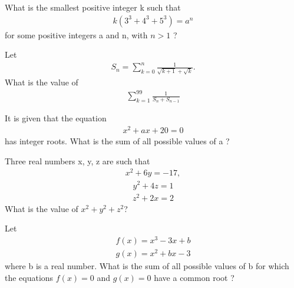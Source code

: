 \item What is the smallest positive integer k such that
\begin{align} 
k(3^{3} + 4^{3} + 5^{3}) = a^{n} 
\end{align}
for some positive integers a and n, with $n > 1$ ?

\item Let 
\begin{align*}
S_{n} = \sum_{k=0}^{n} \frac{1}{\sqrt{k+1} + \sqrt{k}}.
\end{align*}
What is the value of
\begin{align*} 
\sum_{k = 1}^{99} \frac{1}{S_{n} + S_{n - 1}}
\end{align*} 

\item It is given that the equation 
\begin{align}
x^{2} + ax + 20 = 0
\end{align}
has integer roots. What is the sum of all possible values of a ?

\item Three real numbers x, y, z are such that
\begin{align} 
x^{2} + 6y = -17,
\end{align}
\begin{align}
y^{2} + 4z = 1 
\end{align}
\begin{align}
z^{2} + 2x = 2 
\end{align}
What is the value of $x^{2} + y^{2} + z^{2}$?

\item Let 
\begin{align*}
f(x) = x^{3} - 3x + b
\end{align*}
\begin{align*} 
g(x) = x^{2} + bx - 3
\end{align*} 
where b is a real number. What is the sum of all possible values of b for which the equations $f(x) = 0$ and $g(x) = 0$ have a common root ?
